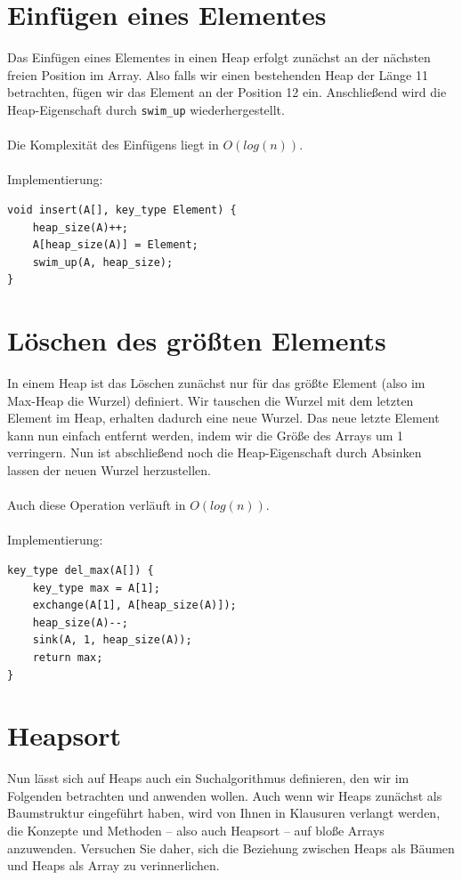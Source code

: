 \documentclass[11pt,a4paper]{scrartcl}
\begin{document}
\section{Einfügen eines Elementes}
Das Einfügen eines Elementes in einen Heap erfolgt zunächst an der nächsten freien Position im Array. Also falls wir einen bestehenden Heap der Länge 11 betrachten, fügen wir das Element an der Position 12 ein. Anschließend wird die Heap-Eigenschaft durch \texttt{swim{\_}up} wiederhergestellt. \\\\
Die Komplexität des Einfügens liegt in $O(log (n))$. \\\\
Implementierung:
\begin{lstlisting}
void insert(A[], key_type Element) {
	heap_size(A)++;
	A[heap_size(A)] = Element;
	swim_up(A, heap_size);
}
\end{lstlisting}
\section{Löschen des größten Elements}
In einem Heap ist das Löschen zunächst nur für das größte Element (also im Max-Heap die Wurzel) definiert. Wir tauschen die Wurzel mit dem letzten Element im Heap, erhalten dadurch eine neue Wurzel. Das neue letzte Element kann nun einfach entfernt werden, indem wir die Größe des Arrays um 1 verringern. Nun ist abschließend noch die Heap-Eigenschaft durch Absinken lassen der neuen Wurzel herzustellen. \\\\
Auch diese Operation verläuft in $O(log(n))$. \\\\
Implementierung:
\begin{lstlisting}
key_type del_max(A[]) {
	key_type max = A[1];
	exchange(A[1], A[heap_size(A)]);
	heap_size(A)--;
	sink(A, 1, heap_size(A));
	return max;
}
\end{lstlisting}
\section{Heapsort}
Nun lässt sich auf Heaps auch ein Suchalgorithmus definieren, den wir im Folgenden betrachten und anwenden wollen. Auch wenn wir Heaps zunächst als Baumstruktur eingeführt haben, wird von Ihnen in Klausuren verlangt werden, die Konzepte und Methoden -- also auch Heapsort -- auf bloße Arrays anzuwenden. Versuchen Sie daher, sich die Beziehung zwischen Heaps als Bäumen und Heaps als Array zu verinnerlichen.  
\end{document}
